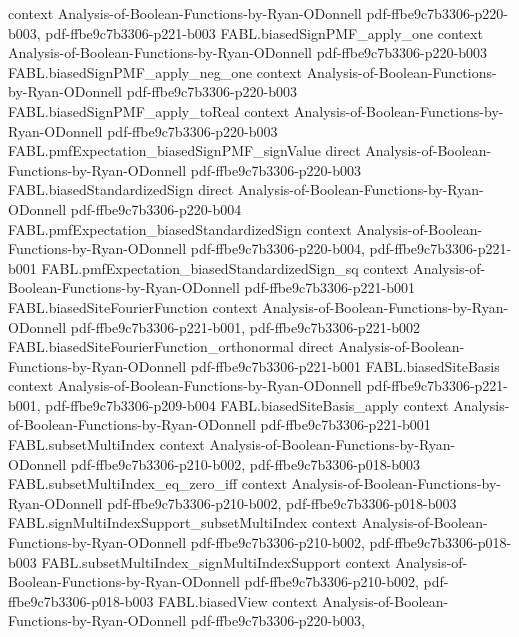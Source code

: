 \begin{theorem}
  {context}
  {Analysis-of-Boolean-Functions-by-Ryan-ODonnell}
  {pdf-ffbe9c7b3306-p220-b003,
    pdf-ffbe9c7b3306-p221-b003}
\proofstep
  {FABL.biasedSignPMF_apply_one}
  {context}
  {Analysis-of-Boolean-Functions-by-Ryan-ODonnell}
  {pdf-ffbe9c7b3306-p220-b003}
\proofstep
  {FABL.biasedSignPMF_apply_neg_one}
  {context}
  {Analysis-of-Boolean-Functions-by-Ryan-ODonnell}
  {pdf-ffbe9c7b3306-p220-b003}
\proofstep
  {FABL.biasedSignPMF_apply_toReal}
  {context}
  {Analysis-of-Boolean-Functions-by-Ryan-ODonnell}
  {pdf-ffbe9c7b3306-p220-b003}
\proofstep
  {FABL.pmfExpectation_biasedSignPMF_signValue}
  {direct}
  {Analysis-of-Boolean-Functions-by-Ryan-ODonnell}
  {pdf-ffbe9c7b3306-p220-b003}
\proofstep
  {FABL.biasedStandardizedSign}
  {direct}
  {Analysis-of-Boolean-Functions-by-Ryan-ODonnell}
  {pdf-ffbe9c7b3306-p220-b004}
\proofstep
  {FABL.pmfExpectation_biasedStandardizedSign}
  {context}
  {Analysis-of-Boolean-Functions-by-Ryan-ODonnell}
  {pdf-ffbe9c7b3306-p220-b004,
    pdf-ffbe9c7b3306-p221-b001}
\proofstep
  {FABL.pmfExpectation_biasedStandardizedSign_sq}
  {context}
  {Analysis-of-Boolean-Functions-by-Ryan-ODonnell}
  {pdf-ffbe9c7b3306-p221-b001}
\proofstep
  {FABL.biasedSiteFourierFunction}
  {context}
  {Analysis-of-Boolean-Functions-by-Ryan-ODonnell}
  {pdf-ffbe9c7b3306-p221-b001,
    pdf-ffbe9c7b3306-p221-b002}
\proofstep
  {FABL.biasedSiteFourierFunction_orthonormal}
  {direct}
  {Analysis-of-Boolean-Functions-by-Ryan-ODonnell}
  {pdf-ffbe9c7b3306-p221-b001}
\proofstep
  {FABL.biasedSiteBasis}
  {context}
  {Analysis-of-Boolean-Functions-by-Ryan-ODonnell}
  {pdf-ffbe9c7b3306-p221-b001,
    pdf-ffbe9c7b3306-p209-b004}
\proofstep
  {FABL.biasedSiteBasis_apply}
  {context}
  {Analysis-of-Boolean-Functions-by-Ryan-ODonnell}
  {pdf-ffbe9c7b3306-p221-b001}
\proofstep
  {FABL.subsetMultiIndex}
  {context}
  {Analysis-of-Boolean-Functions-by-Ryan-ODonnell}
  {pdf-ffbe9c7b3306-p210-b002,
    pdf-ffbe9c7b3306-p018-b003}
\proofstep
  {FABL.subsetMultiIndex_eq_zero_iff}
  {context}
  {Analysis-of-Boolean-Functions-by-Ryan-ODonnell}
  {pdf-ffbe9c7b3306-p210-b002,
    pdf-ffbe9c7b3306-p018-b003}
\proofstep
  {FABL.signMultiIndexSupport_subsetMultiIndex}
  {context}
  {Analysis-of-Boolean-Functions-by-Ryan-ODonnell}
  {pdf-ffbe9c7b3306-p210-b002,
    pdf-ffbe9c7b3306-p018-b003}
\proofstep
  {FABL.subsetMultiIndex_signMultiIndexSupport}
  {context}
  {Analysis-of-Boolean-Functions-by-Ryan-ODonnell}
  {pdf-ffbe9c7b3306-p210-b002,
    pdf-ffbe9c7b3306-p018-b003}
\proofstep
  {FABL.biasedView}
  {context}
  {Analysis-of-Boolean-Functions-by-Ryan-ODonnell}
  {pdf-ffbe9c7b3306-p220-b003,
}
\end{theorem}

